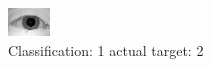 \begin{figure}[h!]
\begin{center}
\includegraphics[width=0.60\columnwidth]{figures/ID988_class_1_target_2.png}
\end{center}
\caption{ Classification: 1 actual target: 2}
\label{fig:ID988_class_1_target_2}
\end{figure}
